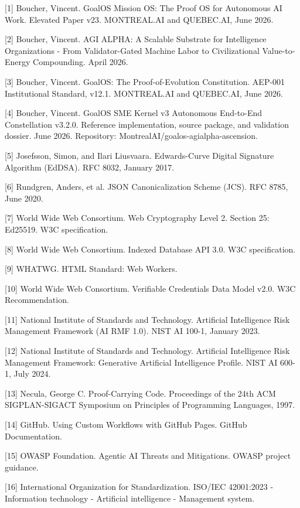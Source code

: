 {[}1{]} Boucher, Vincent. GoalOS Mission OS: The Proof OS for Autonomous
AI Work. Elevated Paper v23. MONTREAL.AI and QUEBEC.AI, June 2026.

{[}2{]} Boucher, Vincent. AGI ALPHA: A Scalable Substrate for
Intelligence Organizations - From Validator-Gated Machine Labor to
Civilizational Value-to-Energy Compounding. April 2026.

{[}3{]} Boucher, Vincent. GoalOS: The Proof-of-Evolution Constitution.
AEP-001 Institutional Standard, v12.1. MONTREAL.AI and QUEBEC.AI, June
2026.

{[}4{]} Boucher, Vincent. GoalOS SME Kernel v3 Autonomous End-to-End
Constellation v3.2.0. Reference implementation, source package, and
validation dossier. June 2026. Repository:
MontrealAI/goalos-agialpha-ascension.

{[}5{]} Josefsson, Simon, and Ilari Liusvaara. Edwards-Curve Digital
Signature Algorithm (EdDSA). RFC 8032, January 2017.

{[}6{]} Rundgren, Anders, et al. JSON Canonicalization Scheme (JCS). RFC
8785, June 2020.

{[}7{]} World Wide Web Consortium. Web Cryptography Level 2. Section 25:
Ed25519. W3C specification.

{[}8{]} World Wide Web Consortium. Indexed Database API 3.0. W3C
specification.

{[}9{]} WHATWG. HTML Standard: Web Workers.

{[}10{]} World Wide Web Consortium. Verifiable Credentials Data Model
v2.0. W3C Recommendation.

{[}11{]} National Institute of Standards and Technology. Artificial
Intelligence Risk Management Framework (AI RMF 1.0). NIST AI 100-1,
January 2023.

{[}12{]} National Institute of Standards and Technology. Artificial
Intelligence Risk Management Framework: Generative Artificial
Intelligence Profile. NIST AI 600-1, July 2024.

{[}13{]} Necula, George C. Proof-Carrying Code. Proceedings of the 24th
ACM SIGPLAN-SIGACT Symposium on Principles of Programming Languages,
1997.

{[}14{]} GitHub. Using Custom Workflows with GitHub Pages. GitHub
Documentation.

{[}15{]} OWASP Foundation. Agentic AI Threats and Mitigations. OWASP
project guidance.

{[}16{]} International Organization for Standardization. ISO/IEC
42001:2023 - Information technology - Artificial intelligence -
Management system.

